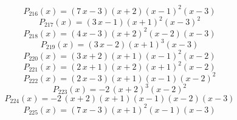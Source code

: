 \subitem \begin{dmath*}P_{216}(x) = {\left(7 \, x - 3\right)} {\left(x + 2\right)} {\left(x - 1\right)}^{2} {\left(x - 3\right)} \end{dmath*}\vspace{-1.2cm}
\subitem \begin{dmath*}P_{217}(x) = {\left(3 \, x - 1\right)} {\left(x + 1\right)}^{2} {\left(x - 3\right)}^{2} \end{dmath*}\vspace{-1.2cm}
\subitem \begin{dmath*}P_{218}(x) = {\left(4 \, x - 3\right)} {\left(x + 2\right)}^{2} {\left(x - 2\right)} {\left(x - 3\right)} \end{dmath*}\vspace{-1.2cm}
\subitem \begin{dmath*}P_{219}(x) = {\left(3 \, x - 2\right)} {\left(x + 1\right)}^{3} {\left(x - 3\right)} \end{dmath*}\vspace{-1.2cm}
\subitem \begin{dmath*}P_{220}(x) = {\left(3 \, x + 2\right)} {\left(x + 1\right)} {\left(x - 1\right)}^{2} {\left(x - 2\right)} \end{dmath*}\vspace{-1.2cm}
\subitem \begin{dmath*}P_{221}(x) = {\left(2 \, x + 1\right)} {\left(x + 2\right)} {\left(x + 1\right)}^{2} {\left(x - 2\right)} \end{dmath*}\vspace{-1.2cm}
\subitem \begin{dmath*}P_{222}(x) = {\left(2 \, x - 3\right)} {\left(x + 1\right)} {\left(x - 1\right)} {\left(x - 2\right)}^{2} \end{dmath*}\vspace{-1.2cm}
\subitem \begin{dmath*}P_{223}(x) = -2 \, {\left(x + 2\right)}^{3} {\left(x - 2\right)}^{2} \end{dmath*}\vspace{-1.2cm}
\subitem \begin{dmath*}P_{224}(x) = -2 \, {\left(x + 2\right)} {\left(x + 1\right)} {\left(x - 1\right)} {\left(x - 2\right)} {\left(x - 3\right)} \end{dmath*}\vspace{-1.2cm}
\subitem \begin{dmath*}P_{225}(x) = {\left(7 \, x - 3\right)} {\left(x + 1\right)}^{2} {\left(x - 1\right)} {\left(x - 3\right)} \end{dmath*}\vspace{-1.2cm}
